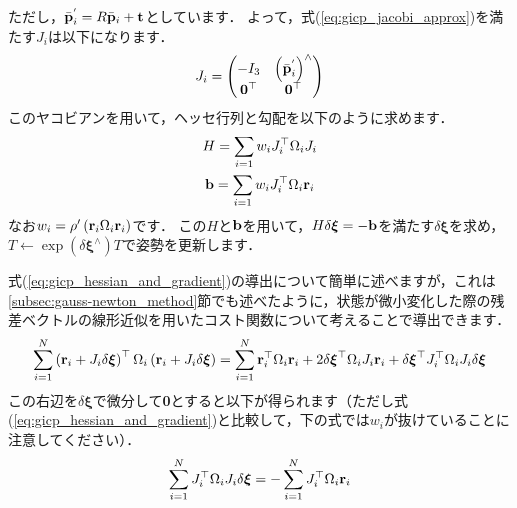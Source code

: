 %
ただし，$\bar{ {\bf p} }_{i}^{'} = R \bar{ {\bf p} }_{i} + {\bf t}$としています．
よって，式(\ref{eq:gicp_jacobi_approx})を満たす$J_{i}$は以下になります．
%
\begin{align}
  J_{i} = \left( \begin{matrix}
            -I_{3}         & \left( \bar{ {\bf p} }_{i}^{'} \right)^{\wedge} \\
            {\bf 0}^{\top} & {\bf 0}^{\top}
          \end{matrix} \right)
  \label{eq:gicp_jacobian}
\end{align}
%
このヤコビアンを用いて，ヘッセ行列と勾配を以下のように求めます．
%
\begin{align}
  \begin{gathered}
    H = \sum_{i=1} w_{i} J_{i}^{\top} \Omega_{i} J_{i} \\
    {\bf b} = \sum_{i=1} w_{i} J_{i}^{\top} \Omega_{i} {\bf r}_{i} \\
  \end{gathered}
  \label{eq:gicp_hessian_and_gradient}
\end{align}
%
なお$w_{i} = \rho^{\prime} \left( {\bf r}_{i} \Omega_{i} {\bf r}_{i} \right)$です．
この$H$と${\bf b}$を用いて，$H \delta \boldsymbol \xi = -{\bf b}$を満たす$\delta \boldsymbol \xi$を求め，$T \leftarrow \exp \left( \delta \boldsymbol \xi^{\wedge} \right) T$で姿勢を更新します．

式(\ref{eq:gicp_hessian_and_gradient})の導出について簡単に述べますが，これは\ref{subsec:gauss-newton_method}節でも述べたように，状態が微小変化した際の残差ベクトルの線形近似を用いたコスト関数について考えることで導出できます．
%
\begin{align}
  \sum_{i=1}^{N} \left( {\bf r}_{i} + J_{i} \delta \boldsymbol \xi \right)^{\top} \Omega_{i} \left( {\bf r}_{i} + J_{i} \delta \boldsymbol \xi \right)
  =
  \sum_{i=1}^{N} {\bf r}_{i}^{\top} \Omega_{i} {\bf r}_{i} + 2 \delta \boldsymbol \xi^{\top} \Omega_{i} J_{i} {\bf r}_{i} + \delta \boldsymbol \xi^{\top} J_{i}^{\top} \Omega_{i} J_{i} \delta \boldsymbol \xi
\end{align}
%
この右辺を$\delta \boldsymbol \xi$で微分して{\bf 0}とすると以下が得られます（ただし式(\ref{eq:gicp_hessian_and_gradient})と比較して，下の式では$w_{i}$が抜けていることに注意してください）．
%
\begin{align}
  \sum_{i=1}^{N} J_{i}^{\top} \Omega_{i} J_{i} \delta \boldsymbol \xi = -\sum_{i=1}^{N}  J_{i}^{\top} \Omega_{i} {\bf r}_{i}
\end{align}
%



